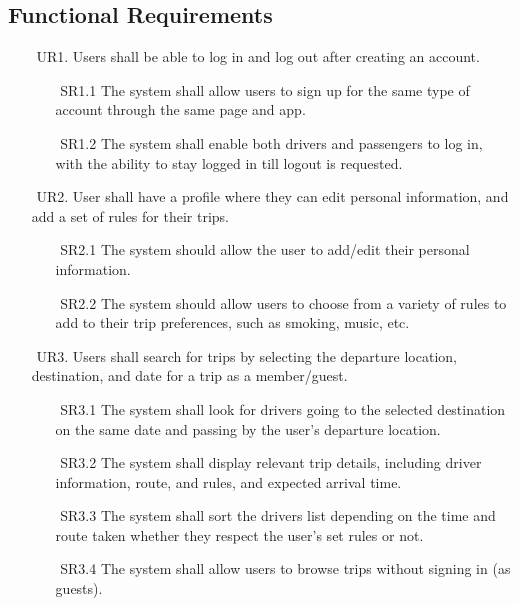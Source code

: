 \documentclass[a4paper, 12pt]{article} %
\begin{document}
        \subsection{Functional Requirements}
           \begin{itemize}
                \item [$ $] UR1. Users shall be able to log in and log out after creating an account.
                \begin{itemize}
                    \item [$ $]SR1.1 The system shall allow users to sign up for the same type of account through the same page and app.
                    \item [$ $]SR1.2 The system shall enable both drivers and passengers to log in, with the ability to stay logged in till logout is requested.
                \end{itemize}
                \item [$ $] UR2. User shall have a profile where they can edit personal information, and add a set of rules for their trips.
                \begin{itemize}
                    \item [$ $] SR2.1 The system should allow the user to add/edit their personal information.
                    \item [$ $] SR2.2 The system should allow users to choose from a variety of rules to add to their trip preferences, such as smoking, music, etc.
                \end{itemize}
                \item [$ $] UR3. Users shall search for trips by selecting the departure location, destination, and date for a trip as a member/guest.
                \begin{itemize}
                    \item [$ $] SR3.1 The system shall look for drivers going to the selected destination on the same date and passing by the user’s departure location.
                    \item [$ $] SR3.2 The system shall display relevant trip details, including driver information, route, and rules, and expected arrival time. 
                    \item [$ $] SR3.3 The system shall sort the drivers list depending on the time and route taken whether they respect the user’s set rules or not.
                    \item [$ $] SR3.4 The system shall allow users to browse trips without signing in (as guests).

\end{itemize}
\end{itemize}
\end{document}
